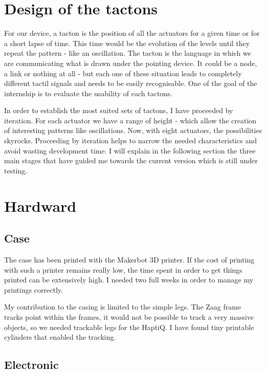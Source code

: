 \section{Design of the tactons}\label{design-of-the-tactons}

For our device, a tacton is the position of all the actuators for a
given time or for a short lapse of time. This time would be the
evolution of the levels until they repeat the pattern - like an
oscillation. The tacton is the language in which we are communicating
what is drawn under the pointing device. It could be a node, a link or
nothing at all - but each one of these situation leads to completely
different tactil signals and needs to be easily recognisable. One of the
goal of the internship is to evaluate the usability of each tactons.

In order to establish the most suited sets of tactons, I have proceeded
by iteration. For each actuator we have a range of height - which allow
the creation of interesting patterns like oscillations. Now, with eight
actuators, the possibilities skyrocks. Proceeding by iteration helps to
narrow the needed characteristics and avoid wasting development time. I
will explain in the following section the three main stages that have
guided me towards the current version which is still under testing.

\section{Hardward}\label{implementation-hardward}

\subsection{Case}

The case has been printed with the Makerbot 3D printer. If the cost of printing with such a printer remains really low, the time spent in order to get things printed can be extensively high. I needed two full weeks in order to manage my printings correctly.

My contribution to the casing is limited to the simple legs. The Zaag frame tracks point within the frames, it would not be possible to track a very massive objects, so we needed trackable legs for the HaptiQ. I have found tiny printable cylinders that enabled the tracking.

\subsection{Electronic}


